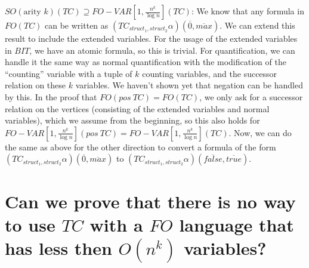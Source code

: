 \(SO(\text{arity }k)(TC) \supseteq FO-VAR\left[ 1, \frac{n^{k}}{\log n} \right](TC)\):
We know that any formula in \(FO(TC)\) can be written as
\((TC_{struct_{1}, struct_{2}}\alpha)(\overline{0}, \overline{max})\).
We can extend this result to include the extended variables. For the
usage of the extended variables in \(BIT\), we have an atomic formula,
so this is trivial. For quantification, we can handle it the same way as
normal quantification with the modification of the ``counting'' variable
with a tuple of \(k\) counting variables, and the successor relation on
these \(k\) variables. We haven't shown yet that negation can be handled
by this. In the proof that \(FO(pos~TC) = FO(TC)\), we only ask for a
successor relation on the vertices (consisting of the extended variables
and normal variables), which we assume from the beginning, so this also
holds for
\(FO-VAR\left[ 1, \frac{n^{k}}{\log n} \right](pos~TC) = FO-VAR\left[ 1, \frac{n^{k}}{\log n} \right](TC)\).
Now, we can do the same as above for the other direction to convert a
formula of the form
\((TC_{struct_{1}, struct_{2}}\alpha)(\overline{0}, \overline{max})\) to
\((TC_{struct_{1}, struct_{2}}\alpha)(\overline{false}, \overline{true})\).

\section{\texorpdfstring{Can we prove that there is no way to use
\(TC\) with a \(FO\) language that has less then \(O(n^{k})\)
variables?}{Can we prove that there is no way to use TC with a FO language that has less then O(n\^{}\{k\}) variables?}}\label{can-we-prove-that-there-is-no-way-to-use-tc-with-a-fo-language-that-has-less-then-onk-variables}

